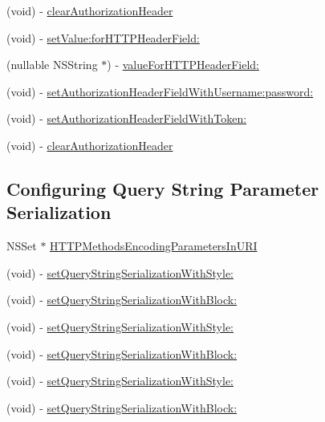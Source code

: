 \begin{DoxyCompactItemize}
\item 
(void) -\/ \mbox{\hyperlink{interface_a_f_h_t_t_p_request_serializer_a211e5d5ca44cd3f2fe0e1f1deeb9ef17}{clear\+Authorization\+Header}}
\item 
(void) -\/ \mbox{\hyperlink{interface_a_f_h_t_t_p_request_serializer_a782d460accdab9c8682550a77f167898}{set\+Value\+:for\+H\+T\+T\+P\+Header\+Field\+:}}
\item 
(nullable N\+S\+String $\ast$) -\/ \mbox{\hyperlink{interface_a_f_h_t_t_p_request_serializer_a11dac7e7ab325f1e937c717f8c4e25b4}{value\+For\+H\+T\+T\+P\+Header\+Field\+:}}
\item 
(void) -\/ \mbox{\hyperlink{interface_a_f_h_t_t_p_request_serializer_a67c09b048eff53d3e9cad39a954d5676}{set\+Authorization\+Header\+Field\+With\+Username\+:password\+:}}
\item 
(void) -\/ \mbox{\hyperlink{interface_a_f_h_t_t_p_request_serializer_aa7426bb8422c203a0aeb17f8c04ff8e6}{set\+Authorization\+Header\+Field\+With\+Token\+:}}
\item 
(void) -\/ \mbox{\hyperlink{interface_a_f_h_t_t_p_request_serializer_a211e5d5ca44cd3f2fe0e1f1deeb9ef17}{clear\+Authorization\+Header}}
\end{DoxyCompactItemize}
\subsection*{Configuring Query String Parameter Serialization}
\label{_amgrp405aa0e72fa6384e81d0024aa952f05d}%


 

 \begin{DoxyCompactItemize}
\item 
N\+S\+Set $\ast$ \mbox{\hyperlink{interface_a_f_h_t_t_p_request_serializer_a4eb24be673e7b7a764896b4914ed93d4}{H\+T\+T\+P\+Methods\+Encoding\+Parameters\+In\+U\+RI}}
\item 
(void) -\/ \mbox{\hyperlink{interface_a_f_h_t_t_p_request_serializer_af86bfabe2989e5730b187fe5f2f2a9e7}{set\+Query\+String\+Serialization\+With\+Style\+:}}
\item 
(void) -\/ \mbox{\hyperlink{interface_a_f_h_t_t_p_request_serializer_a3b30fd73d2913d6c86ac338f79a88c68}{set\+Query\+String\+Serialization\+With\+Block\+:}}
\item 
(void) -\/ \mbox{\hyperlink{interface_a_f_h_t_t_p_request_serializer_af86bfabe2989e5730b187fe5f2f2a9e7}{set\+Query\+String\+Serialization\+With\+Style\+:}}
\item 
(void) -\/ \mbox{\hyperlink{interface_a_f_h_t_t_p_request_serializer_a3b30fd73d2913d6c86ac338f79a88c68}{set\+Query\+String\+Serialization\+With\+Block\+:}}
\item 
(void) -\/ \mbox{\hyperlink{interface_a_f_h_t_t_p_request_serializer_af86bfabe2989e5730b187fe5f2f2a9e7}{set\+Query\+String\+Serialization\+With\+Style\+:}}
\item 
(void) -\/ \mbox{\hyperlink{interface_a_f_h_t_t_p_request_serializer_a3b30fd73d2913d6c86ac338f79a88c68}{set\+Query\+String\+Serialization\+With\+Block\+:}}
\end{DoxyCompactItemize}


